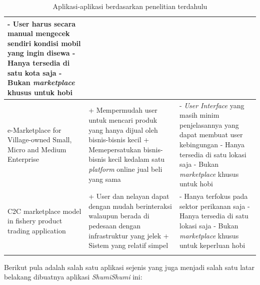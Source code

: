 \documentclass[a4paper]{article}
\begin{document}
\begin{longtable}{|p{3cm}|p{5cm}|p{5cm}|}
    - User harus secara manual mengecek sendiri kondisi mobil yang ingin disewa \newline
    - Hanya tersedia di satu kota saja \newline
    - Bukan \textit{marketplace} khusus untuk hobi                                                                                               \\
    \hline
    e-Marketplace for Village-owned Small, Micro and Medium Enterprise
             & + Mempermudah user untuk mencari produk yang hanya dijual oleh bisnis-bisnis kecil \newline
    + Memepersatukan bisnis-bisnis kecil kedalam satu \textit{platform} online jual beli yang sama \newline
             & - \textit{User Interface} yang masih minim penjelasannya yang dapat membuat user kebingungan \newline
    - Hanya tersedia di satu lokasi saja \newline
    - Bukan \textit{marketplace} khusus untuk hobi                                                                                               \\
    \hline
    C2C marketplace model in fishery product trading application
             & + User dan nelayan dapat dengan mudah berinteraksi walaupun berada di pedesaan dengan infrastruktur yang jelek \newline
    + Sistem yang relatif simpel \newline
             & - Hanya terfokus pada sektor perikanan saja \newline
    - Hanya tersedia di satu lokasi saja \newline
    - Bukan \textit{marketplace} khusus untuk keperluan hobi                                                                                     \\
    \hline
    \caption{Aplikasi-aplikasi berdasarkan penelitian terdahulu}
\end{longtable}

Berikut pula adalah salah satu aplikasi sejenis yang juga menjadi salah satu latar belakang dibuatnya aplikasi \textit{ShumiShumi} ini:
\end{document}

